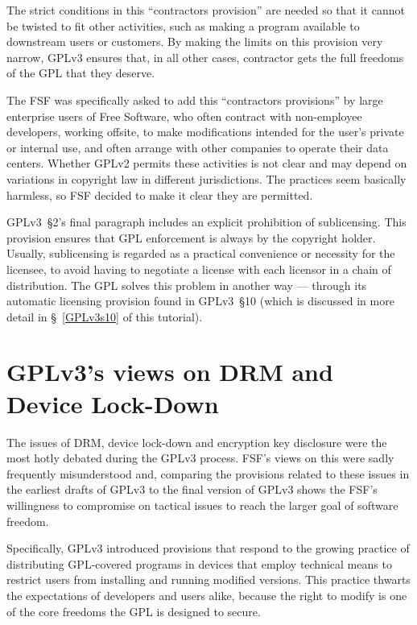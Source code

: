 The strict conditions in this ``contractors provision'' are needed so that it
cannot be twisted to fit other activities, such as making a program available
to downstream users or customers.  By making the limits on this provision
very narrow, GPLv3 ensures that, in all other cases, contractor gets the
full freedoms of the GPL that they deserve.

The FSF was specifically asked to add this ``contractors provisions'' by
large enterprise users of Free Software, who often contract with non-employee
developers, working offsite, to make modifications intended for the user's
private or internal use, and often arrange with other companies to operate
their data centers.  Whether GPLv2 permits these activities is not clear and
may depend on variations in copyright law in different jurisdictions.  The
practices seem basically harmless, so FSF decided to make it clear they are
permitted.

GPLv3~\S2's final paragraph includes an explicit prohibition of sublicensing.
This provision ensures that GPL enforcement is always by the copyright
holder.  Usually, sublicensing is regarded as a practical convenience or
necessity for the licensee, to avoid having to negotiate a license with each
licensor in a chain of distribution.  The GPL solves this problem in another
way --- through its automatic licensing provision found in GPLv3~\S10 (which
is discussed in more detail in \S~\ref{GPLv3s10} of this tutorial).

\section{GPLv3's views on DRM and Device Lock-Down}
\label{GPLv3-drm}

The issues of DRM, device lock-down and encryption key disclosure were the
most hotly debated during the GPLv3 process.  FSF's views on this were sadly
frequently misunderstood and, comparing the provisions related to these
issues in the earliest drafts of GPLv3 to  the final version of GPLv3 shows
the FSF's willingness to compromise on tactical issues to reach the larger
goal of software freedom.

Specifically, GPLv3 introduced provisions that respond to the growing
practice of distributing GPL-covered programs in devices that employ
technical means to restrict users from installing and running modified
versions.  This practice thwarts the expectations of developers and users
alike, because the right to modify is one of the core freedoms the GPL is
designed to secure.

